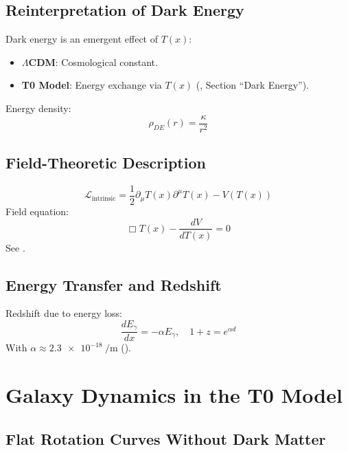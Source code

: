 \documentclass[a4paper,12pt]{article}
\theoremstyle{definition}
\theoremstyle{remark}
\newcommand{\Tfield}{T(x)}
\begin{document}
	\subsection{Reinterpretation of Dark Energy}
	
	Dark energy is an emergent effect of \(\Tfield\):
	\begin{itemize}
		\item \textbf{\(\Lambda\)CDM}: Cosmological constant.
		\item \textbf{T0 Model}: Energy exchange via \(\Tfield\) (\cite{pascher_energy_2025}, Section “Dark Energy”).
	\end{itemize}
	Energy density:
	\begin{equation}
		\rho_{DE}(r) = \frac{\kappa}{r^2}
	\end{equation}
	
	\subsection{Field-Theoretic Description}
	
	\begin{equation}
		\mathcal{L}_\text{intrinsic} = \frac{1}{2} \partial_\mu \Tfield \partial^\mu \Tfield - V(\Tfield)
	\end{equation}
	Field equation:
	\begin{equation}
		\Box \Tfield - \frac{dV}{d\Tfield} = 0
	\end{equation}
	See \cite{pascher_lagrange_2025}.
	
	\subsection{Energy Transfer and Redshift}
	
	Redshift due to energy loss:
	\begin{equation}
		\frac{d E_{\gamma}}{d x} = -\alpha E_{\gamma}, \quad 1 + z = e^{\alpha d}
	\end{equation}
	With \(\alpha \approx \SI{2.3e-18}{\per\meter}\) (\cite{pascher_messdifferenzen_2025}).
	
	\section{Galaxy Dynamics in the T0 Model}
	
	\subsection{Flat Rotation Curves Without Dark Matter}
	
\end{document}
